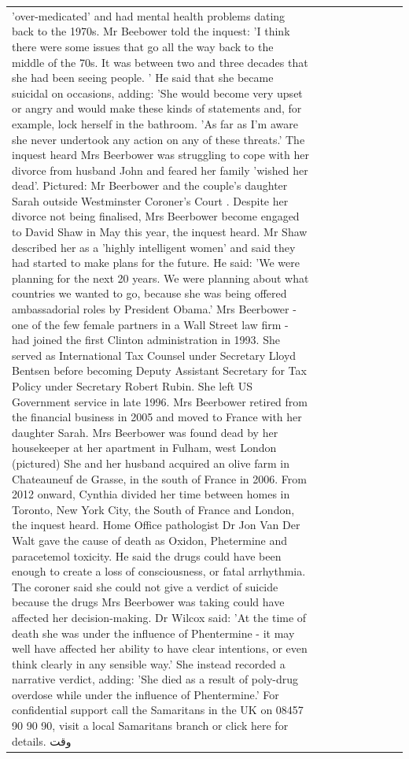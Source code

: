 \begin{table}[H]
\begin{tabular}{lllrlllll}
'over-medicated' and had mental health problems dating back to the 1970s. Mr Beebower told the inquest: 'I think there were some issues that go all the way back to the middle of the 70s. It was between two and three decades that she had been seeing people. ' He said that she became suicidal on occasions, adding: 'She would become very upset or angry and would make these kinds of statements and, for example, lock herself in the bathroom. 'As far as I'm aware she never undertook any action on any of these threats.' The inquest heard Mrs Beerbower was struggling to cope with her divorce from husband John and feared her family 'wished her dead'. Pictured: Mr Beerbower and the couple's daughter Sarah outside Westminster Coroner's Court . Despite her divorce not being finalised, Mrs Beerbower become engaged to David Shaw in May this year, the inquest heard. Mr Shaw described her as a 'highly intelligent women' and said they had started to make plans for the future. He said: 'We were planning for the next 20 years. We were planning about what countries we wanted to go, because she was being offered ambassadorial roles by President Obama.' Mrs Beerbower - one of the few female partners in a Wall Street law firm - had joined the first Clinton administration in 1993. She served as International Tax Counsel under Secretary Lloyd Bentsen before becoming Deputy Assistant Secretary for Tax Policy under Secretary Robert Rubin. She left US Government service in late 1996. Mrs Beerbower retired from the financial business in 2005 and moved to France with her daughter Sarah. Mrs Beerbower was found dead by her housekeeper at her apartment in Fulham, west London (pictured) She and her husband acquired an olive farm in Chateauneuf de Grasse, in the south of France in 2006. From 2012 onward, Cynthia divided her time between homes in Toronto, New York City, the South of France and London, the inquest heard. Home Office pathologist Dr Jon Van Der Walt gave the cause of death as Oxidon, Phetermine and paracetemol toxicity. He said the drugs could have been enough to create a loss of consciousness, or fatal arrhythmia. The coroner said she could not give a verdict of suicide because the drugs Mrs Beerbower was taking could have affected her decision-making. Dr Wilcox said: 'At the time of death she was under the influence of Phentermine - it may well have affected her ability to have clear intentions, or even think clearly in any sensible way.' She instead recorded a narrative verdict, adding: 'She died as a result of poly-drug overdose while under the influence of Phentermine.' For confidential support call the Samaritans in the UK on 08457 90 90 90, visit a local Samaritans branch or click here for details. وقت \\

\end{tabular}
\end{table}
